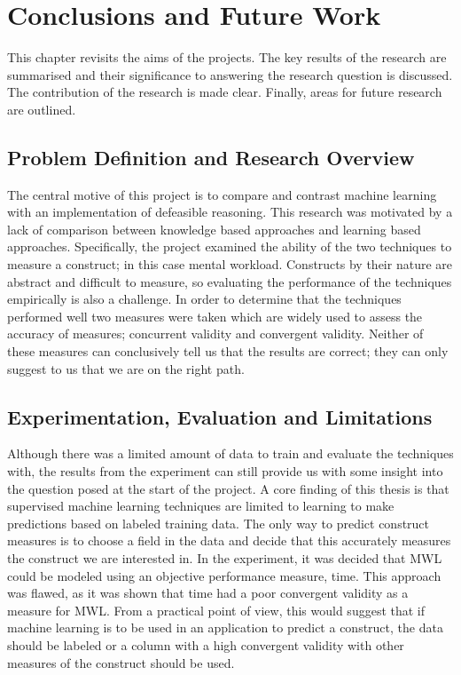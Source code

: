 
\chapter{Conclusions and Future Work} %

\label{Chapter6} 


This chapter revisits the aims of the projects. The key results of the research are summarised and their significance to answering the research question is discussed. The contribution of the research is made clear. Finally, areas for future research are outlined.

\section{Problem Definition and Research Overview}

The central motive of this project is to compare and contrast machine learning with an implementation of defeasible reasoning. This research was motivated by a lack of comparison between knowledge based approaches and learning based approaches. Specifically, the project examined the ability of the two techniques to measure a construct; in this case mental workload. Constructs by their nature are abstract and difficult to measure, so evaluating the performance of the techniques empirically is also a challenge. In order to determine that the techniques performed well two measures were taken which are widely used to assess the accuracy of measures; concurrent validity and convergent validity. Neither of these measures can conclusively tell us that the results are correct; they can only suggest to us that we are on the right path.


\section{Experimentation, Evaluation and Limitations}

Although there was a limited amount of data to train and evaluate the techniques with, the results from the experiment can still provide us with some insight into the question posed at the start of the project. A core finding of this thesis is that supervised machine learning techniques are limited to learning to make predictions based on labeled training data. The only way to predict construct measures is to choose a field in the data and decide that this accurately measures the construct we are interested in. In the experiment, it was decided that MWL could be modeled using an objective performance measure, time. This approach was flawed, as it was shown that time had a poor convergent validity as a measure for MWL. From a practical point of view, this would suggest that if machine learning is to be used in an application to predict a construct, the data should be labeled or a column with a high convergent validity with other measures of the construct should be used. 

